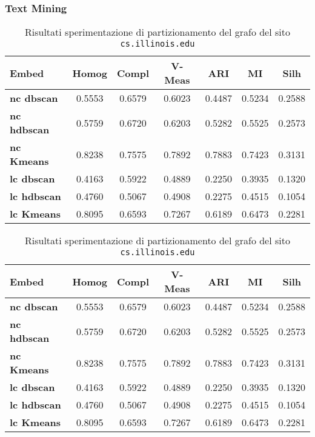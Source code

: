 \subsubsection{Text Mining}

\begin{table}[H]
	\begin{tabular}{| l | c | c | c | c | c | c |}
	\hline
	\textbf{Embed}  & \textbf{Homog} & \textbf{Compl} & \textbf{V-Meas}  & \textbf{ARI}  & \textbf{MI}  & \textbf{Silh} \\ [3ex] \hline
	\textbf{nc dbscan} & 0.5553 & 0.6579 & 0.6023 & 0.4487 & 0.5234 & 0.2588\\ [3ex]
	 \hline 
	\textbf{nc hdbscan} & 0.5759 & 0.6720 & 0.6203 & 0.5282 & 0.5525 & 0.2573\\ [3ex]
	 \hline
	\textbf{nc Kmeans} & 0.8238 & 0.7575 & 0.7892 & 0.7883 & 0.7423 & 0.3131\\ [3ex]
	 \hline	
	\textbf{lc dbscan} & 0.4163 & 0.5922 & 0.4889 & 0.2250 & 0.3935 & 0.1320\\ [3ex]
	\hline
	\textbf{lc hdbscan} & 0.4760 & 0.5067 & 0.4908 & 0.2275 & 0.4515 & 0.1054\\ [3ex]
	\hline
	
	\textbf{lc Kmeans} & 0.8095 & 0.6593 & 0.7267 & 0.6189 & 0.6473 & 0.2281\\ [3ex]
	\hline
	\end{tabular}
	\caption{Risultati sperimentazione di partizionamento del grafo del sito \texttt{cs.illinois.edu}}
	\label{metricheEmbed}
\end{table}


\begin{table}[H]
	\begin{tabular}{| l | c | c | c | c | c | c |}
	\hline
	\textbf{Embed}  & \textbf{Homog} & \textbf{Compl} & \textbf{V-Meas}  & \textbf{ARI}  & \textbf{MI}  & \textbf{Silh} \\ [3ex] \hline
	\textbf{nc dbscan} & 0.5553 & 0.6579 & 0.6023 & 0.4487 & 0.5234 & 0.2588\\ [3ex]
	 \hline 
	\textbf{nc hdbscan} & 0.5759 & 0.6720 & 0.6203 & 0.5282 & 0.5525 & 0.2573\\ [3ex]
	 \hline
	\textbf{nc Kmeans} & 0.8238 & 0.7575 & 0.7892 & 0.7883 & 0.7423 & 0.3131\\ [3ex]
	 \hline	
	\textbf{lc dbscan} & 0.4163 & 0.5922 & 0.4889 & 0.2250 & 0.3935 & 0.1320\\ [3ex]
	\hline
	\textbf{lc hdbscan} & 0.4760 & 0.5067 & 0.4908 & 0.2275 & 0.4515 & 0.1054\\ [3ex]
	\hline
	
	\textbf{lc Kmeans} & 0.8095 & 0.6593 & 0.7267 & 0.6189 & 0.6473 & 0.2281\\ [3ex]
	\hline
	\end{tabular}
	\caption{Risultati sperimentazione di partizionamento del grafo del sito \texttt{cs.illinois.edu}}
	\label{metricheEmbed}
\end{table}


